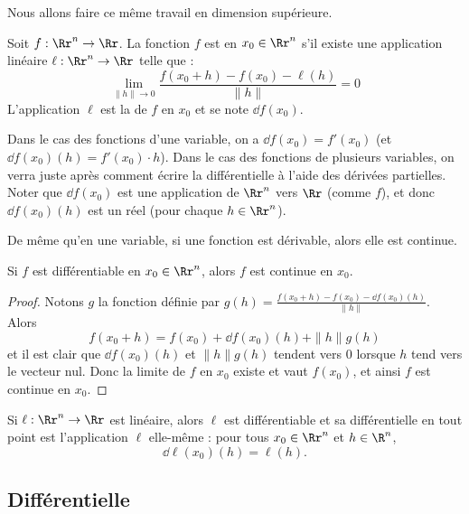 \documentclass[11pt, class=report,crop=false]{standalone}
\begin{document}
\bigskip

Nous allons faire ce même travail en dimension supérieure.
\begin{definition}
Soit $f : \Rr^n \to \Rr$. La fonction $f$ est  en $x_0 \in \Rr^n$ s'il existe une application linéaire $\ell : \Rr^n \to \Rr$ telle que :
$$\lim_{\|h\| \to 0}  \frac{f(x_0+ h) - f(x_0) - \ell(h)}{\|h\|} = 0$$
L'application $\ell $ est la  de $f$ en $x_0$ et se note $\dd f(x_0)$.
\end{definition}


Dans le cas des fonctions d'une variable, on a $\dd f(x_0) = f'(x_0)$ (et $\dd f(x_0)(h) = f'(x_0)\cdot h$).
Dans le cas des fonctions de plusieurs variables, on verra juste après comment écrire la différentielle à l'aide des dérivées partielles.
Noter que $\dd f(x_0)$ est une application de $\Rr^n$ vers $\Rr$ (comme $f$), et donc $\dd f(x_0)(h)$ est un réel (pour chaque $h\in\Rr^n$).


\bigskip

De même qu'en une variable, si une fonction est dérivable, alors elle est continue.
\begin{proposition}
\label{prop:diffcont}
Si $f$ est différentiable en $x_0 \in \Rr^n$, alors $f$ est continue en $x_0$.
\end{proposition}

\begin{proof}
Notons $g$ la fonction définie par $g(h)=\frac{f(x_0+h) - f(x_0) - \dd f(x_0)(h)}{\|h\|}$. Alors 
$$f(x_0 + h)=f(x_0) + \dd f(x_0)(h) +\|h\|g(h)$$
et il est clair que $\dd f(x_0)(h)$ et $\|h\|g(h)$ tendent vers $0$ lorsque $h$ tend vers le vecteur nul. Donc la limite de $f$ en $x_0$ existe et vaut $f(x_0)$, et ainsi $f$ est continue en $x_0$.
\end{proof}

\begin{exemple}
Si $\ell : \Rr^n \to \Rr$ est linéaire, alors $\ell$ est différentiable et sa différentielle en tout point est l'application $\ell$ elle-même : pour tous $x_0 \in \Rr^n$ et $h \in \R^n$,
$$
\dd \ell (x_0) (h) = \ell(h).
$$ 
\end{exemple}




\subsection{Différentielle}
\end{document}
